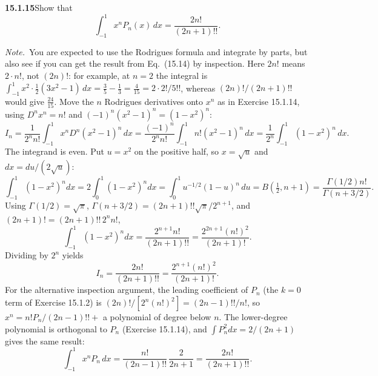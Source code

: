 \par\bigskip
\noindent\textbf{15.1.15}\quad Show that
\[
\int_{-1}^{1}x^{n}P_{n}(x)\,dx=\frac{2n!}{(2n+1)!!}.
\]
\par\emph{Note.}~You are expected to use the Rodrigues formula and
integrate by parts, but also see if you can get the result from
Eq.~(15.14) by inspection.
\solution
Here $2n!$ means $2\cdot n!$, not $(2n)!$: for example, at $n=2$ the
integral is $\int_{-1}^1x^2\cdot\frac12(3x^2-1)\,dx=\frac35-\frac13
=\frac4{15}=2\cdot2!/5!!$, whereas $(2n)!/(2n+1)!!$ would give
$\frac{24}{15}$.
Move the $n$ Rodrigues derivatives onto $x^n$ as in Exercise 15.1.14,
using $D^nx^n=n!$ and $(-1)^n(x^2-1)^n=(1-x^2)^n$:
\[
I_n=\frac1{2^nn!}\int_{-1}^1x^nD^n(x^2-1)^n\,dx
=\frac{(-1)^n}{2^nn!}\int_{-1}^1n!(x^2-1)^n\,dx
=\frac1{2^n}\int_{-1}^1(1-x^2)^n\,dx.
\]
The integrand is even. Put $u=x^2$ on the positive half, so
$x=\sqrt u$ and $dx=du/(2\sqrt u)$:
\[
\int_{-1}^1(1-x^2)^ndx
=2\int_0^1(1-x^2)^ndx
=\int_0^1u^{-1/2}(1-u)^n\,du
=B(\tfrac12,n+1)=\frac{\Gamma(1/2)n!}{\Gamma(n+3/2)}.
\]
Using $\Gamma(1/2)=\sqrt\pi$, $\Gamma(n+3/2)=(2n+1)!!\sqrt\pi/2^{n+1}$,
and $(2n+1)!=(2n+1)!!\,2^nn!$,
\[
\int_{-1}^1(1-x^2)^ndx=\frac{2^{n+1}n!}{(2n+1)!!}
=\frac{2^{2n+1}(n!)^2}{(2n+1)!}.
\]
Dividing by $2^n$ yields
\[
\boxed{I_n=\frac{2n!}{(2n+1)!!}
=\frac{2^{n+1}(n!)^2}{(2n+1)!}}.
\]
For the alternative inspection argument, the leading coefficient of
$P_n$ (the $k=0$ term of Exercise 15.1.2) is
$(2n)!/[2^n(n!)^2]=(2n-1)!!/n!$, so
$x^n=n!P_n/(2n-1)!!+$ a polynomial of degree below $n$.
The lower-degree polynomial is orthogonal to $P_n$
(Exercise 15.1.14), and $\int P_n^2dx=2/(2n+1)$ gives the same result:
\[
\int_{-1}^1x^nP_n\,dx=\frac{n!}{(2n-1)!!}\,\frac2{2n+1}
=\frac{2n!}{(2n+1)!!}.
\]

